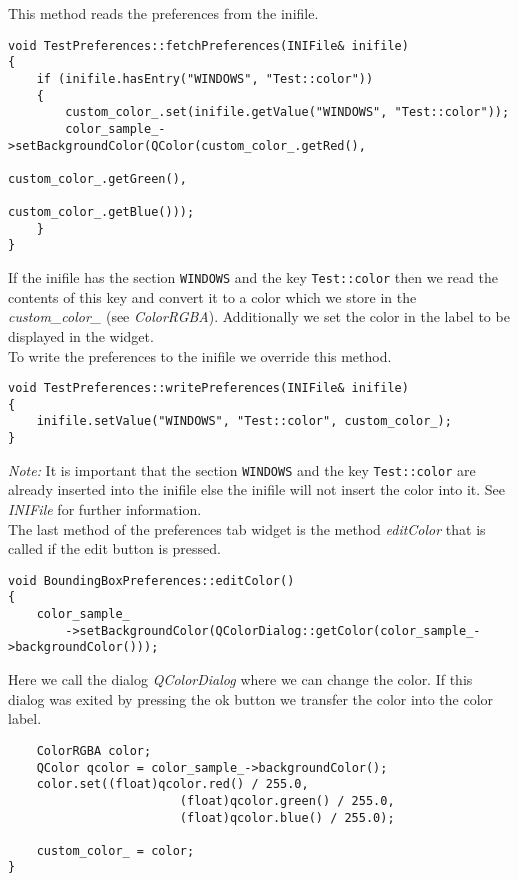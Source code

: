 This method reads the preferences from the inifile.

\begin{verbatim}
void TestPreferences::fetchPreferences(INIFile& inifile)
{
	if (inifile.hasEntry("WINDOWS", "Test::color"))
	{
		custom_color_.set(inifile.getValue("WINDOWS", "Test::color"));
		color_sample_->setBackgroundColor(QColor(custom_color_.getRed(), 
																						 custom_color_.getGreen(), 
																						 custom_color_.getBlue()));
	}
}
\end{verbatim}

If the inifile has the section {\tt WINDOWS} and the key {\tt Test::color} then
we read the contents of this key and convert it to a color which we store in the
{\em custom\_color\_} (see {\em ColorRGBA}). Additionally we set the color in the label to be displayed
in the widget.\\

To write the preferences to the inifile we override this method.

\begin{verbatim}
void TestPreferences::writePreferences(INIFile& inifile)
{
	inifile.setValue("WINDOWS", "Test::color", custom_color_);
}
\end{verbatim}

{\em Note:} It is important that the section {\tt WINDOWS} and the key {\tt Test::color} are
already inserted into the inifile else the inifile will not insert the color
into it. See {\em INIFile} for further information.\\

The last method of the preferences tab widget is the method {\em editColor} that
is called if the edit button is pressed.

\begin{verbatim}
void BoundingBoxPreferences::editColor()
{
	color_sample_
		->setBackgroundColor(QColorDialog::getColor(color_sample_->backgroundColor()));
\end{verbatim}

Here we call the dialog {\em QColorDialog} where we can change the color. If this
dialog was exited by pressing the ok button we transfer the color into the color label.

\begin{verbatim}
	ColorRGBA color;
	QColor qcolor = color_sample_->backgroundColor();
	color.set((float)qcolor.red() / 255.0,
						(float)qcolor.green() / 255.0,
						(float)qcolor.blue() / 255.0);
	
	custom_color_ = color;
}
\end{verbatim}


